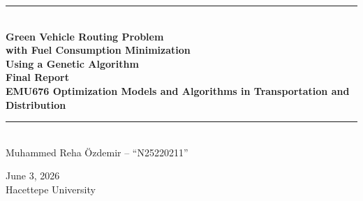 \documentclass [a4paper, 11pt, titlepage] {article}
\date{June 3, 2026}
\begin{document}
\setlength{\parindent}{4mm}
\renewcommand{\algorithmiccomment}[1]{//#1}

\begin{titlepage}
  \begin{center}
    \noindent\rule{\linewidth}{1mm}\\[4mm]
    {\sffamily\bfseries \Huge Green Vehicle Routing Problem}\\[2mm]
    {\sffamily\bfseries \Large with Fuel Consumption Minimization}\\[1mm]
    {\sffamily\bfseries \Large Using a Genetic Algorithm} \\[4mm]
    {\sffamily\bfseries \Large Final Report}\\[0mm]
    {\sffamily\bfseries \Large EMU676 Optimization Models and Algorithms in Transportation and Distribution}\\[0mm]
    \noindent\rule{\linewidth}{1mm}\\[30mm]
    \large Muhammed Reha \"{O}zdemir -- ``N25220211'' \\


    \large June 3, 2026 \\[6mm]
    Hacettepe University
  \end{center}
\end{titlepage}

\newpage
{}
\tableofcontents
\newpage
{}
\end{document}
